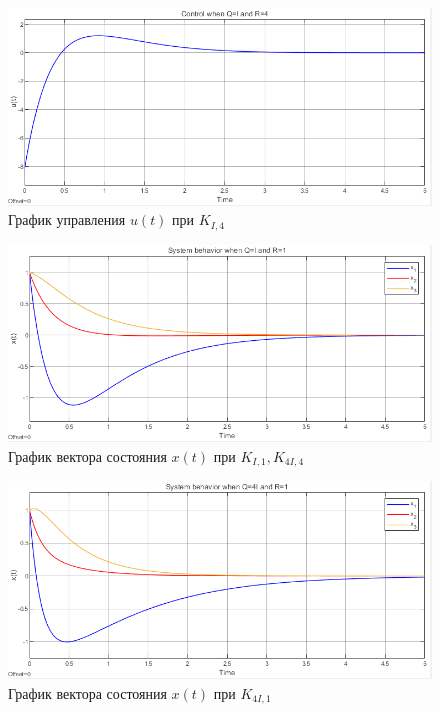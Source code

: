 \documentclass[a4paper, 12pt]{article}
\begin{document}
    \begin{figure}[H]
        \centering
        \includegraphics[scale=0.75]{1task_uuu.png}
        \captionsetup{skip=0pt}
        \caption{График управления $u(t)$ при $K_{I,4}$}
        \label{fig:1task_uuu}
    \end{figure}
    \begin{figure}[H]
        \centering
        \includegraphics[scale=0.75]{1task_x.png}
        \captionsetup{skip=0pt}
        \caption{График вектора состояния $x(t)$ при $K_{I,1},K_{4I,4}$}
        \label{fig:1task_x}
    \end{figure}
    \begin{figure}[H]
        \centering
        \includegraphics[scale=0.75]{1task_xx.png}
        \captionsetup{skip=0pt}
        \caption{График вектора состояния $x(t)$ при $K_{4I,1}$}
        \label{fig:1task_xx}
    \end{figure}
\end{document}
